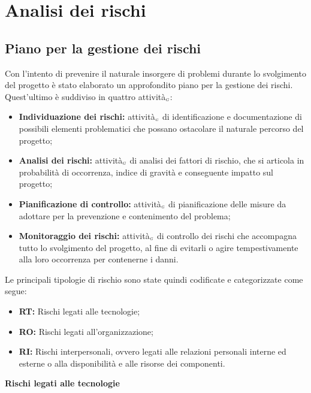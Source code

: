 \chapter{Analisi dei rischi}\label{AnalisiDeiRischi}

\section{Piano per la gestione dei rischi}\label{AnalisiDeiRischiPianoPerLaGestioneDeiRischi}
Con l'intento di prevenire il naturale insorgere di problemi durante lo svolgimento del progetto è stato elaborato un approfondito piano per la gestione dei rischi. Quest'ultimo è suddiviso in quattro attività$_{\scaleto{G}{3pt}}$:
\begin{itemize}
  \item \textbf{Individuazione dei rischi:} attività$_{\scaleto{G}{3pt}}$ di identificazione e documentazione di possibili elementi problematici che possano ostacolare il naturale percorso del progetto;
  \item \textbf{Analisi dei rischi:} attività$_{\scaleto{G}{3pt}}$ di analisi dei fattori di rischio, che si articola in probabilità di occorrenza, indice di gravità e conseguente impatto sul progetto;
  \item \textbf{Pianificazione di controllo:} attività$_{\scaleto{G}{3pt}}$ di pianificazione delle misure da adottare per la prevenzione e contenimento del problema;
  \item \textbf{Monitoraggio dei rischi:} attività$_{\scaleto{G}{3pt}}$ di controllo dei rischi che accompagna tutto lo svolgimento del progetto, al fine di evitarli o agire tempestivamente alla loro occorrenza per contenerne i danni.
\end{itemize}
Le principali tipologie di rischio sono state quindi codificate e categorizzate come segue:
\begin{itemize}
  \item \textbf{RT:} Rischi legati alle tecnologie;
  \item \textbf{RO:} Rischi legati all'organizzazione;
  \item \textbf{RI:} Rischi interpersonali, ovvero legati alle relazioni personali interne ed esterne o alla disponibilità e alle risorse dei componenti.
\end{itemize}

\clearpage
\quad
\begin{center}
	\LARGE\textbf{Rischi legati alle tecnologie}
\end{center}

